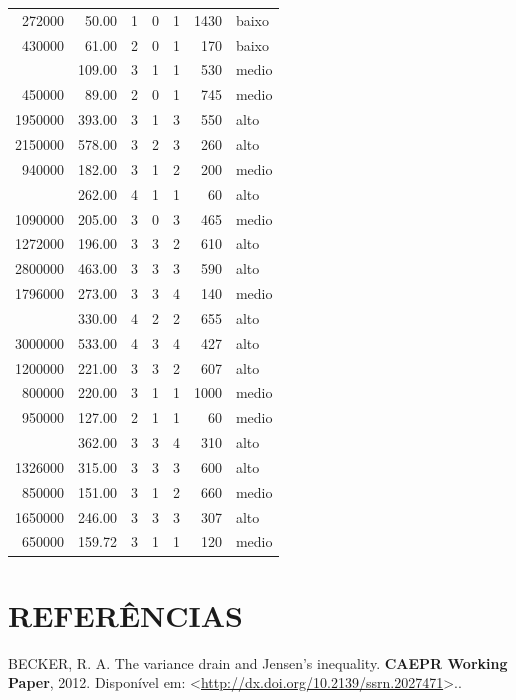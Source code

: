 \documentclass[a4paper]{article}
\begin{document}
\begin{table}[H]
\begin{tabular}{rrrrrrl}
272000 & 50.00 & 1 & 0 & 1 & 1430 & baixo\\
430000 & 61.00 & 2 & 0 & 1 & 170 & baixo\\
\addlinespace
895000 & 109.00 & 3 & 1 & 1 & 530 & medio\\
450000 & 89.00 & 2 & 0 & 1 & 745 & medio\\
1950000 & 393.00 & 3 & 1 & 3 & 550 & alto\\
2150000 & 578.00 & 3 & 2 & 3 & 260 & alto\\
940000 & 182.00 & 3 & 1 & 2 & 200 & medio\\
\addlinespace
1400000 & 262.00 & 4 & 1 & 1 & 60 & alto\\
1090000 & 205.00 & 3 & 0 & 3 & 465 & medio\\
1272000 & 196.00 & 3 & 3 & 2 & 610 & alto\\
2800000 & 463.00 & 3 & 3 & 3 & 590 & alto\\
1796000 & 273.00 & 3 & 3 & 4 & 140 & medio\\
\addlinespace
1400000 & 330.00 & 4 & 2 & 2 & 655 & alto\\
3000000 & 533.00 & 4 & 3 & 4 & 427 & alto\\
1200000 & 221.00 & 3 & 3 & 2 & 607 & alto\\
800000 & 220.00 & 3 & 1 & 1 & 1000 & medio\\
950000 & 127.00 & 2 & 1 & 1 & 60 & medio\\
\addlinespace
2061000 & 362.00 & 3 & 3 & 4 & 310 & alto\\
1326000 & 315.00 & 3 & 3 & 3 & 600 & alto\\
850000 & 151.00 & 3 & 1 & 2 & 660 & medio\\
1650000 & 246.00 & 3 & 3 & 3 & 307 & alto\\
650000 & 159.72 & 3 & 1 & 1 & 120 & medio\\
\bottomrule
\end{tabular}
\end{table}

\section*{REFERÊNCIAS}\label{referencias}

\hypertarget{refs}{}
\hypertarget{ref-becker}{}
BECKER, R. A. The variance drain and Jensen's inequality. \textbf{CAEPR
Working Paper}, 2012. Disponível em:
\textless{}\url{http://dx.doi.org/10.2139/ssrn.2027471}\textgreater{}..
\end{document}

